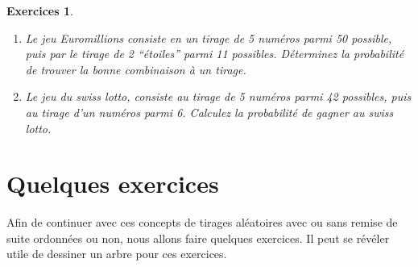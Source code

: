 \documentclass[a4paper,12pt]{book}
\newtheorem*{exercices}{Exercices}
\begin{document}
\begin{exercices}
\hfill\break
 \begin{enumerate}
  \item Le jeu Euromillions consiste en un tirage de 5 numéros parmi 50 possible, puis par le tirage de 2 ``étoiles'' parmi 11 possibles.
  Déterminez la probabilité de trouver la bonne combinaison à un tirage.
  \item Le jeu du swiss lotto, consiste au tirage de 5 numéros parmi 42 possibles, puis au tirage d'un numéros parmi 6. Calculez la probabilité de 
  gagner au swiss lotto.
 \end{enumerate}
\end{exercices}

\section{Quelques exercices}
Afin de continuer avec ces concepts de tirages aléatoires avec ou sans remise
de suite ordonnées ou non, nous allons faire quelques exercices. Il peut se révéler utile de dessiner un arbre pour ces exercices.
\end{document}

